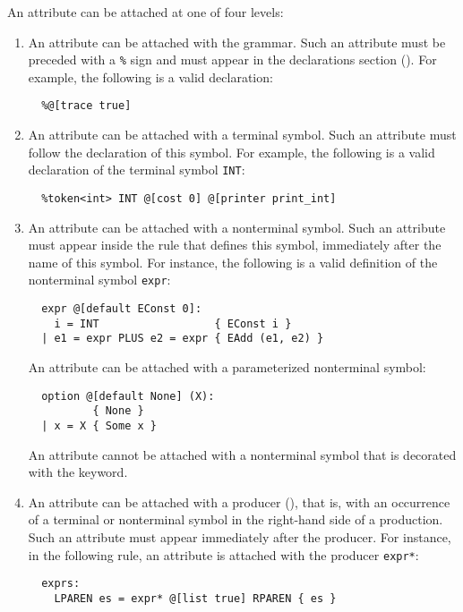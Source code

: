 \documentclass[onecolumn,11pt,nocopyrightspace,preprint]{sigplanconf}
\begin{document}
An attribute can be attached at one of four levels:
\begin{enumerate}

\item An attribute can be attached with the grammar.
  Such an attribute must be preceded with a \verb+%+ sign and must appear
  in the declarations section (). For example, the following
  is a valid declaration:
\begin{verbatim}
  %@[trace true]
\end{verbatim}

\item An attribute can be attached with a terminal symbol.
  Such an attribute must follow the declaration of this symbol.
  For example, the following is a valid declaration of the terminal symbol \verb+INT+:
\begin{verbatim}
  %token<int> INT @[cost 0] @[printer print_int]
\end{verbatim}

\item An attribute can be attached with a nonterminal symbol.
  Such an attribute must appear inside the rule that defines this symbol,
  immediately after the name of this symbol. For instance, the following is a valid
  definition of the nonterminal symbol \verb+expr+:
\begin{verbatim}
  expr @[default EConst 0]:
    i = INT                  { EConst i }
  | e1 = expr PLUS e2 = expr { EAdd (e1, e2) }
\end{verbatim}
  An attribute can be attached with a parameterized nonterminal symbol:
\begin{verbatim}
  option @[default None] (X):
          { None }
  | x = X { Some x }
\end{verbatim}
  An attribute cannot be attached with a nonterminal symbol that is
  decorated with the \dinline keyword.

\item An attribute can be attached with a producer (),
  that is, with an occurrence of a terminal or nonterminal symbol in the
  right-hand side of a production. Such an attribute must appear immediately
  after the producer. For instance, in the following rule,
  an attribute is attached with the producer \verb+expr*+:
\begin{verbatim}
  exprs:
    LPAREN es = expr* @[list true] RPAREN { es }
\end{verbatim}

\end{enumerate}
\end{document}
